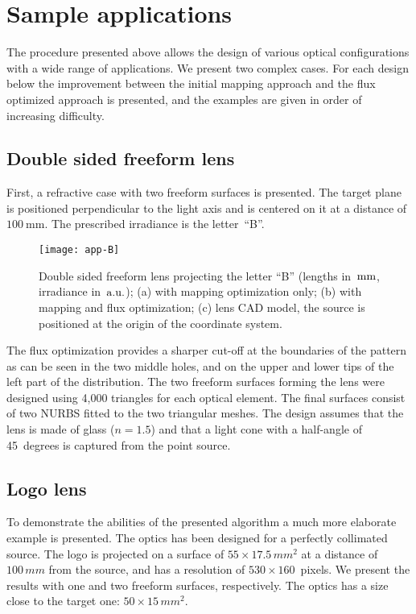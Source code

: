 \section{Sample applications}
\label{sec:results}
The procedure presented above allows the design of various optical
configurations with a wide range of applications. We present two
complex cases. For each design below the improvement between the
initial mapping approach and the flux optimized approach is presented,
and the examples are given in order of increasing difficulty.

\subsection{Double sided freeform lens}
First, a refractive case with two freeform surfaces is presented.  The
target plane is positioned perpendicular to the light axis and is
centered on it at a distance of $100\mathrm{~mm}$.  The prescribed irradiance
is the letter~``B''.

\begin{figure}[!htbp]
  \centering \texttt{[image: app-B]}
  \caption{Double sided freeform lens projecting the letter ``B''
    (lengths in~$\rm mm$, irradiance in~$\rm a.u.$); (a) with mapping
    optimization only; (b) with mapping and flux optimization; (c)
    lens CAD model, the source is positioned at the origin of the
    coordinate system.  }
  \label{fig:letter}
\end{figure}

The flux optimization provides a sharper cut-off at the boundaries of
the pattern as can be seen in the two middle holes, and on the upper
and lower tips of the left part of the distribution.  The two freeform
surfaces forming the lens were designed using 4,000 triangles for each
optical element.  The final surfaces consist of two NURBS fitted to
the two triangular meshes.  The design assumes that the lens is made
of glass ($n=1.5$) and that a light cone with a half-angle of
45~degrees is captured from the point source.

\subsection{Logo lens}
To demonstrate the abilities of the presented algorithm a much more
elaborate example is presented.  The optics has been designed for a
perfectly collimated source. The logo is projected on a surface of $55
\times 17.5\,mm^2$ at a distance of $100\,mm$ from the source, and has
a resolution of $530 \times 160$~pixels. We present the results with
one and two freeform surfaces, respectively. The optics has a size
close to the target one: $50 \times 15\,mm^2$.


